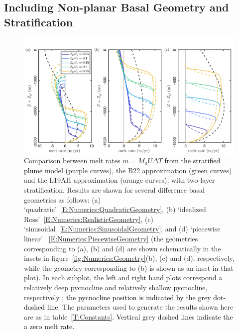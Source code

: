 \documentclass[openacc]{rsproca_new}%
\newcommand{\red}[1]{{\color{red} #1}}
\newcommand{\blue}[1]{{\color{blue} #1}}
\newcommand{\rout}[1]{\red{\st{#1}}}\newcommand{\ab}[1]{\textcolor{Green}{#1}}\newcommand{\about}[1]{\textcolor{Cyan}{\sout{#1}}}
\renewcommand{\rout}[1]{{}} %
\renewcommand{\blue}[1]{{\textcolor{black}{#1}}} %
\renewcommand{\red}[1]{{}} %
\begin{document}
\subsection{Including Non-planar Basal Geometry and Stratification}
\begin{figure}
\centering
\includegraphics[width = \textwidth]{./make_plots/plots/figure7.png}
\caption{Comparison between \rout{numerically obtained }melt rates $\dot{m}= M_0 U \Delta T$ \blue{from the stratified plume model} (purple curves), the B22 approximation (green curves) and the L19AH approximation (orange curves), with two layer stratification. Results are shown for several difference basal geometries as follows: (a) `quadratic'~\eqref{E:Numerics:QuadraticGeometry}, (b) `idealized Ross'~\eqref{E:Numerics:RealisticGeometry}, (c) `sinusoidal~\eqref{E:Numerics:SinusoidalGeometry}, and (d) `piecewise linear' ~\eqref{E:Numerics:PiecewiseGeometry} (the geometries corresponding to (a), (b) and (d) are shown schematically in the insets in figure~\ref{fig:Numerics:Geometry}(b), (c) and (d), respectively, while the geometry corresponding to (b) is shown as an inset in that plot). In each subplot, the left and right hand plots correspond a relatively deep pycnocline and relatively shallow pycnocline, respectively \blue{; the pycnocline position is indicated by the grey dot-dashed line}. The parameters used to generate the results shown here are as in table~\ref{T:Constants}. \blue{Vertical grey dashed lines indicate the a zero melt rate.} }\label{fig:Numerics:pycnocline_and_geometry_idealized}
\end{figure}
\end{document}
